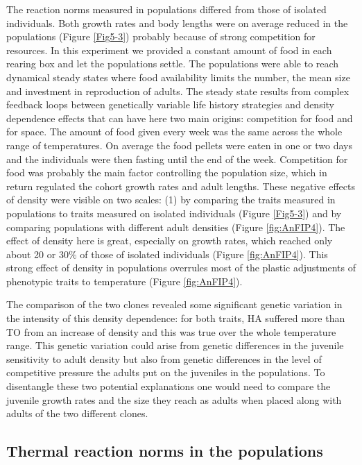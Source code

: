 The reaction norms measured in populations differed from those of isolated
individuals. Both growth rates and body lengths were on average reduced in the
populations (Figure \ref{Fig5-3}) probably because of strong competition for
resources.
In this experiment we provided a constant amount of food in each rearing box and
let the populations settle. The populations were able to reach dynamical steady
states where food availability limits the number, the mean size and investment
in reproduction of adults. The steady state results from complex feedback loops
between genetically variable life history strategies \autocites{tully2008a,stam1996a}
 and density dependence effects \autocites{kokko2007a} that can have here
 two main origins:
competition for food and for space. The amount of food given every week was the
same across the whole range of temperatures. On average the food pellets were
eaten in one or two days and the individuals were then fasting until the end of
the week. Competition for food was probably the main factor controlling the
population size, which in return regulated the cohort growth rates and adult
lengths. These negative effects of density were visible on two scales: (1) by
comparing the traits measured in populations to traits measured on isolated
individuals (Figure \ref{Fig5-3}) and by comparing populations with different
adult densities (Figure \ref{fig:AnFIP4}). The effect of density here is great,
especially on growth rates, which reached only about 20 or $30\%$ of those of
isolated individuals (Figure \ref{fig:AnFIP4}). This strong effect of density in populations overrules most of the plastic
adjustments of phenotypic traits to temperature (Figure \ref{fig:AnFIP4}).

The comparison of the two clones revealed some significant genetic variation in
the intensity of this density dependence: for both traits, HA suffered more than
TO from an increase of density and this was true over the whole temperature
range. This genetic variation could arise from genetic differences in the
juvenile sensitivity to adult density but also from genetic differences in the
level of competitive pressure the adults put on the juveniles in the
populations. To disentangle these two potential explanations one would need to
compare the juvenile growth rates and the size they reach as adults when placed
along with adults of the two different clones.


\subsection{Thermal reaction norms in the populations}

